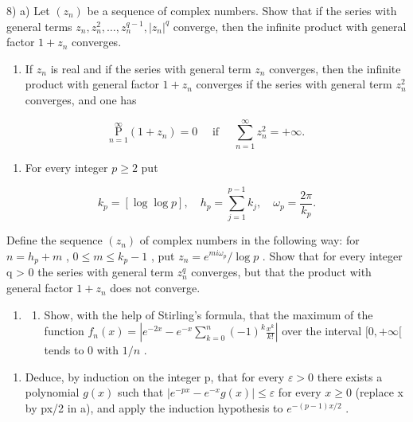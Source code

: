 8) a) Let \((z_{n})\) be a sequence of complex numbers. Show that if the series with general terms \(z_{n}, z_{n}^{2}, \ldots, z_{n}^{q-1}, |z_{n}|^{q}\) converge, then the infinite product with general factor \(1 + z_{n}\) converges.

\begin{enumerate}
\def\labelenumi{\alph{enumi})}
\setcounter{enumi}{1}
\tightlist
\item
  If \(z_{n}\) is real and if the series with general term \(z_{n}\) converges, then the infinite product with general factor \(1 + z_{n}\) converges if the series with general term \(z_{n}^{2}\) converges, and one has
\end{enumerate}

\[
\underset {n = 1} {\overset {\infty} {\mathrm{P}}} (1 + z _ {n}) = 0 \quad \text { if } \quad \sum_ {n = 1} ^ {\infty} z _ {n} ^ {2} = + \infty .
\]

\begin{enumerate}
\def\labelenumi{\alph{enumi})}
\setcounter{enumi}{2}
\tightlist
\item
  For every integer \(p \geqslant 2\) put
\end{enumerate}

\[
k _ {p} = [ \log \log p ], \quad h _ {p} = \sum_ {j = 1} ^ {p - 1} k _ {j}, \quad \omega_ {p} = \frac {2 \pi}{k _ {p}}.
\]

Define the sequence \((z_{n})\) of complex numbers in the following way: for \(n = h_{p} + m\) , \(0 \leqslant m \leqslant k_{p} - 1\) , put \(z_{n} = e^{mi\omega_{p}} / \log p\) . Show that for every integer q \textgreater{} 0 the series with general term \(z_{n}^{q}\) converges, but that the product with general factor \(1 + z_{n}\) does not converge.

\begin{enumerate}
\def\labelenumi{\arabic{enumi})}
\setcounter{enumi}{8}
\tightlist
\item
  \begin{enumerate}
  \def\labelenumii{\alph{enumii})}
  \tightlist
  \item
    Show, with the help of Stirling's formula, that the maximum of the function \(f_{n}(x) = \left|e^{-2x} - e^{-x}\sum_{k=0}^{n}(-1)^{k}\frac{x^{k}}{k!}\right|\) over the interval \([0, +\infty[\) tends to 0 with \(1/n\) .
  \end{enumerate}
\end{enumerate}

\begin{enumerate}
\def\labelenumi{\alph{enumi})}
\setcounter{enumi}{1}
\tightlist
\item
  Deduce, by induction on the integer p, that for every \(\varepsilon > 0\) there exists a polynomial \(g(x)\) such that \(\left|e^{-px} - e^{-x}g(x)\right| \leqslant \varepsilon\) for every \(x \geqslant 0\) (replace x by px/2 in a), and apply the induction hypothesis to \(e^{-(p-1)x/2}\) .
\end{enumerate}

